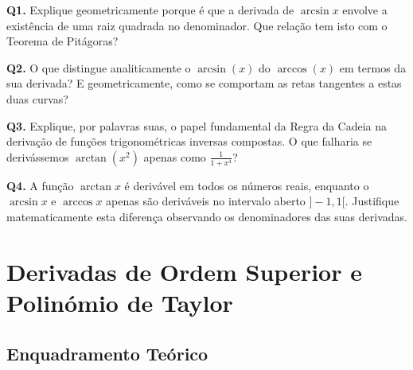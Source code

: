 \begin{oralbox}
  \textbf{Q1.} Explique geometricamente porque é que a derivada de $\arcsin x$ envolve a existência de uma raiz quadrada no denominador. Que relação tem isto com o Teorema de Pitágoras?
\end{oralbox}

\begin{oralbox}
  \textbf{Q2.} O que distingue analiticamente o $\arcsin(x)$ do $\arccos(x)$ em termos da sua derivada? E geometricamente, como se comportam as retas tangentes a estas duas curvas?
\end{oralbox}

\begin{oralbox}
  \textbf{Q3.} Explique, por palavras suas, o papel fundamental da Regra da Cadeia na derivação de funções trigonométricas inversas compostas. O que falharia se derivássemos $\arctan(x^2)$ apenas como $\frac{1}{1+x^4}$?
\end{oralbox}

\begin{oralbox}
  \textbf{Q4.} A função $\arctan x$ é derivável em todos os números reais, enquanto o $\arcsin x$ e $\arccos x$ apenas são deriváveis no intervalo aberto $]-1, 1[$. Justifique matematicamente esta diferença observando os denominadores das suas derivadas.
\end{oralbox}



\section{Derivadas de Ordem Superior e Polinómio de Taylor}

\subsection{Enquadramento Teórico}

